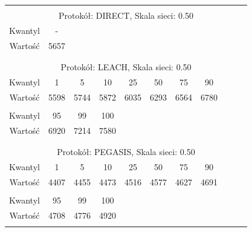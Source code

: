 \documentclass[a4paper,12pt,twoside,openany]{report}
\begin{document}
\begin{longtable}{*{11}{c}}
\toprule \\*
\multicolumn{11}{c}{Protokół: DIRECT, Skala sieci: 0.50} \\*
Kwantyl	& -	\\*
Wartość	& 5657	\\*
\midrule \\*
\\*
\multicolumn{11}{c}{Protokół: LEACH, Skala sieci: 0.50} \\*
Kwantyl	& 1	& 5	& 10	& 25	& 50	& 75	& 90	\\*
Wartość	& 5598	& 5744	& 5872	& 6035	& 6293	& 6564	& 6780	\\*
& \\*
Kwantyl	& 95	& 99	& 100	\\*
Wartość	& 6920	& 7214	& 7580	\\*
\midrule \\*
\\*
\multicolumn{11}{c}{Protokół: PEGASIS, Skala sieci: 0.50} \\*
Kwantyl	& 1	& 5	& 10	& 25	& 50	& 75	& 90	\\*
Wartość	& 4407	& 4455	& 4473	& 4516	& 4577	& 4627	& 4691	\\*
& \\*
Kwantyl	& 95	& 99	& 100	\\*
Wartość	& 4708	& 4776	& 4920	\\*
\bottomrule \\*
\end{longtable}
\end{document}
